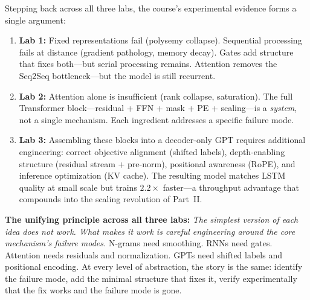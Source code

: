 Stepping back across all three labs, the course's experimental evidence forms a single argument:

\begin{enumerate}
\item \textbf{Lab 1:} Fixed representations fail (polysemy collapse). Sequential processing fails at distance (gradient pathology, memory decay). Gates add structure that fixes both---but serial processing remains. Attention removes the Seq2Seq bottleneck---but the model is still recurrent.

\item \textbf{Lab 2:} Attention alone is insufficient (rank collapse, saturation). The full Transformer block---residual + FFN + mask + PE + scaling---is a \emph{system}, not a single mechanism. Each ingredient addresses a specific failure mode.

\item \textbf{Lab 3:} Assembling these blocks into a decoder-only GPT requires additional engineering: correct objective alignment (shifted labels), depth-enabling structure (residual stream + pre-norm), positional awareness (RoPE), and inference optimization (KV cache). The resulting model matches LSTM quality at small scale but trains $2.2\times$ faster---a throughput advantage that compounds into the scaling revolution of Part~II.
\end{enumerate}

\textbf{The unifying principle across all three labs:} \emph{The simplest version of each idea does not work. What makes it work is careful engineering around the core mechanism's failure modes.} N-grams need smoothing. RNNs need gates. Attention needs residuals and normalization. GPTs need shifted labels and positional encoding. At every level of abstraction, the story is the same: identify the failure mode, add the minimal structure that fixes it, verify experimentally that the fix works and the failure mode is gone.
